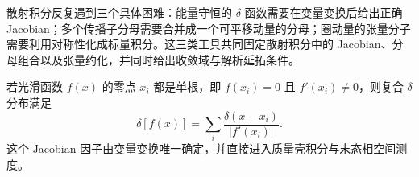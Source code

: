 
散射积分反复遇到三个具体困难：能量守恒的 $\delta$ 函数需要在变量变换后给出正确 Jacobian；多个传播子分母需要合并成一个可平移动量的分母；圈动量的张量分子需要利用对称性化成标量积分。这三类工具共同固定散射积分中的 Jacobian、分母组合以及张量约化，并同时给出收敛域与解析延拓条件。

若光滑函数 $f(x)$ 的零点 $x_i$ 都是单根，即 $f(x_i)=0$ 且 $f'(x_i)\neq0$，则复合 $\delta$ 分布满足
\begin{equation}
{
\delta[f(x)]
=\sum_i\frac{\delta(x-x_i)}{|f'(x_i)|}.}
\label{eq:delta-composition-r68}
\end{equation}
这个 Jacobian 因子由变量变换唯一确定，并直接进入质量壳积分与末态相空间测度。

